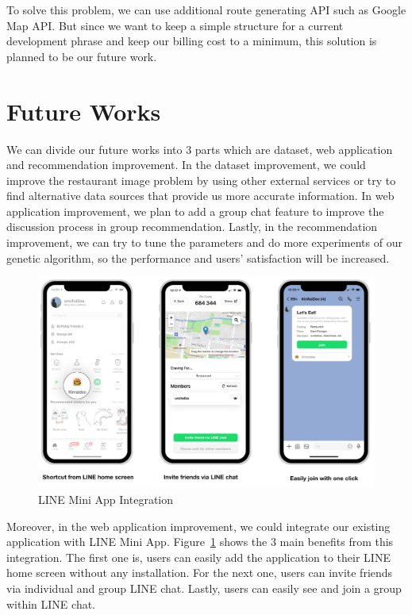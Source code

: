\documentclass[12pt,oneside,openright,a4paper]{cpe-english-project}
\begin{document}
To solve this problem, we can use additional route generating API such as Google Map API. But since we want to keep a simple structure for a current development phrase and keep our billing cost to a minimum, this solution is planned to be our future work.

\section{Future Works}

We can divide our future works into 3 parts which are dataset, web application and recommendation improvement. In the dataset improvement, we could improve the restaurant image problem by using other external services or try to find alternative data sources that provide us more accurate information. In web application improvement, we plan to add a group chat feature to improve the discussion process in group recommendation. Lastly, in the recommendation improvement, we can try to tune the parameters and do more experiments of our genetic algorithm, so the performance and users’ satisfaction will be increased.

\begin{figure}[H]\centering
\includegraphics[width=400pt]{./images/5LINEMiniAppIntegration.png}
\caption{LINE Mini App Integration}\label{fig:5LINEMiniAppIntegration}
\end{figure}\vspace{-24pt}

Moreover, in the web application improvement, we could integrate our existing application with LINE Mini App. Figure~\ref{fig:5LINEMiniAppIntegration} shows the 3 main benefits from this integration. The first one is, users can easily add the application to their LINE home screen without any installation. For the next one, users can invite friends via individual and group LINE chat. Lastly, users can easily see and join a group within LINE chat.
\end{document}
